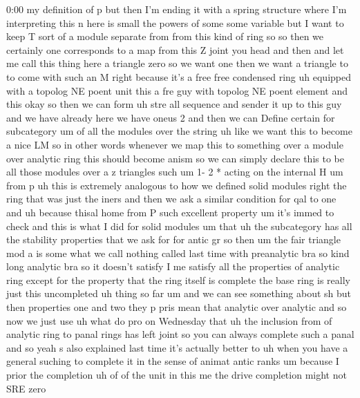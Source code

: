 \begin{unfinished}{0:00}
my  definition  of  p  but  then  I'm  ending
it  with  a  spring  structure  where  I'm
interpreting  this  n  here  is  small  the
powers  of  some  some
variable  but  I  want  to  keep  T  sort  of  a
module  separate  from  from  this  kind  of
ring
so  so  then  we
certainly  one  corresponds  to  a
map  from  this  Z  joint  you  head  and
then  and  let  me  call  this  thing
here  a  triangle
zero
so  we  want  one  then  we
want  a  triangle  to  to  come  with  such  an
M  right  because  it's  a  free  free
condensed  ring  uh  equipped  with  a
topolog  NE  poent  unit  this  a  fre  guy
with  topolog  NE  poent  element  and
this  okay  so  then  we  can
form  uh  stre  all  sequence  and  sender  it
up
to  this  guy
and  we  have  already  here  we  have  oneus
2  and  then  we  can  Define  certain  for
subcategory  um  of  all  the  modules
over  the
string  uh  like  we  want  this  to  become  a
nice  LM  so  in  other  words  whenever  we
map  this  to  something  over  a  module  over
analytic  ring  this  should  become  anism
so  we  can  simply  declare  this  to  be  all
those
modules  over  a  z
triangles
such  um  1-  2
*  acting  on  the  internal
H  um
from
p
uh  this  is  extremely  analogous  to  how  we
defined  solid  modules
right  the  ring  that  was  just  the  iners
and  then  we  ask  a  similar  condition  for
qal  to
one
and
uh  because  thisal  home  from  P  such
excellent  property
um  it's  immed  to  check  and  this  is  what
I  did  for  solid  modules  um
that  uh  the  subcategory  has  all  the
stability  properties  that  we  ask  for  for
antic  gr  so
then  um  the  fair  triangle  mod
a  is  some  what  we  call  nothing  called
last  time  with  preanalytic  bra  so  kind
long  analytic  bra  so  it  doesn't  satisfy
I  me  satisfy  all  the  properties  of
analytic  ring  except  for  the  property
that  the  ring  itself  is
complete  the  base  ring  is  really  just
this  uncompleted  uh  thing  so  far  um  and
we  can  see  something
about
sh  but  then  properties  one  and  two  they
p  pris  mean  that
analytic  over
analytic
and  so  now  we  just  use  uh  what  do  pro  on
Wednesday  that  uh  the  inclusion  from  of
analytic  ring  to  panal  rings  has  left
joint  so  you  can  always  complete  such  a
panal
and
so  yeah  s  also  explained  last  time  it's
actually  better  to  uh  when  you  have  a
general  suching  to  complete  it  in  the
sense  of  animat  antic  ranks  um  because  I
prior  the
completion  uh  of  of  the  unit  in  this  me
the  drive  completion  might  not  SRE  zero

\end{unfinished}
